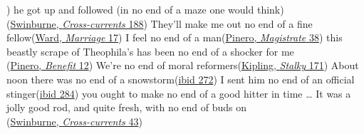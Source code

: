 ) %
\ex he got up and followed (in no end of a maze one would think)\\\hfill(\href{https://archive.org/details/lovescrosscurren00swinuoft/page/172/mode/2up?q=%22followed%2C+in+no%22&view=theater}{Swinburne, \textit{Cross-currents} 188}) %
\ex They'll make me out no end of a fine fellow\hfill(\href{https://archive.org/details/marriageofwillia0000mrsh_i0u5/page/12/mode/2up?q=%22no+end+of+a+fine%22&view=theater}{Ward, \textit{Marriage} 17})
\ex I feel no end of a man\hfill(\href{https://archive.org/details/magistratefarcei00pinerich/page/38/mode/2up?q=%22feel+no+end+of%22&view=theater}{Pinero, \textit{Magistrate} 38})
\ex this beastly scrape of Theophila's has been no end of a shocker for me\\\hfill(\href{https://archive.org/details/benefitdoubtaco00pinegoog/page/n27/mode/2up?q=%22beastly+scrape%22&view=theater}{Pinero, \textit{Benefit} 12})
\ex We're no end of moral reformers\hfill(\href{https://archive.org/details/stalkyandco015455mbp/page/n167/mode/2up?q=%22end+of+moral%22&view=theater}{Kipling, \textit{Stalky} 171})
\ex About noon there was no end of a snowstorm\hfill(\href{https://archive.org/details/stalkyandco015455mbp/page/n267/mode/2up?q=%22about+noon+there%22&view=theater}{ibid 272})
\ex I sent him no end of an official stinger\hfill(\href{https://archive.org/details/stalkyandco015455mbp/page/n279/mode/2up?q=%22sent+him+no+end+of%22&view=theater}{ibid 284})
\ex you ought to make no end of a good hitter in time {\dots} It was a jolly good rod, and quite fresh, with no end of buds on\\\hfill(\href{https://archive.org/details/lovescrosscurren00swinuoft/page/30/mode/2up?q=%22you+ought+to+make%22&view=theater}{Swinburne, \textit{Cross-currents} 43})
\z
\z
{}
